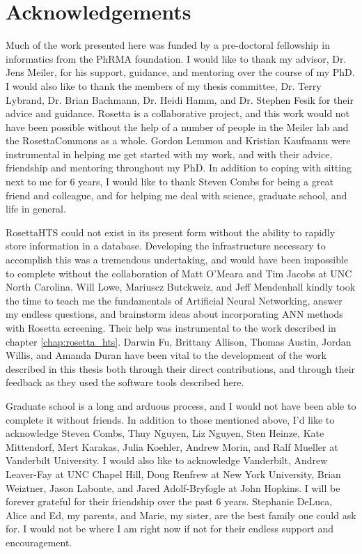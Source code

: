 \chapter*{Acknowledgements}
\vspace{7mm}

Much of the work presented here was funded by a pre-doctoral fellowship in informatics from the PhRMA foundation.
I would like to thank my advisor, Dr. Jens Meiler, for his support, guidance, and mentoring over the course of my PhD. 
I would also like to thank the members of my thesis committee, Dr. Terry Lybrand, Dr. Brian Bachmann, Dr. Heidi Hamm, and Dr. Stephen Fesik for their advice and guidance.
Rosetta is a collaborative project, and this work would not have been possible without the help of a number of people in the Meiler lab and the RosettaCommons as a whole.
Gordon Lemmon and Kristian Kaufmann were instrumental in helping me get started with my work, and with their advice, friendship and mentoring throughout my PhD.
In addition to coping with sitting next to me for 6 years, I would like to thank Steven Combs for being a great friend and colleague, and for helping me deal with science, graduate school, and life in general.

RosettaHTS could not exist in its present form without the ability to rapidly store information in a database.
Developing the infrastructure necessary to accomplish this was a tremendous undertaking, and would have been impossible to complete without the collaboration of Matt O'Meara and Tim Jacobs at UNC North Carolina.
Will Lowe, Mariuscz Butckweiz, %
and Jeff Mendenhall kindly took the time to teach me the fundamentals of Artificial Neural Networking, answer my endless questions, and brainstorm ideas about incorporating ANN methods with Rosetta screening.
Their help was instrumental to the work described in chapter \ref{chap:rosetta_hts}.
Darwin Fu, Brittany Allison, Thomas Austin, Jordan Willis, and Amanda Duran have been vital to the development of the work described in this thesis both through their direct contributions, and through their feedback as they used the software tools described here.

Graduate school is a long and arduous process, and I would not have been able to complete it without friends.
In addition to those mentioned above, I'd like to acknowledge Steven Combs, Thuy Nguyen, Liz Nguyen, Sten Heinze, Kate Mittendorf, Mert Karakas, Julia Koehler, Andrew Morin, and Ralf Mueller at Vanderbilt University.%
I would also like to acknowledge  Vanderbilt, Andrew Leaver-Fay at UNC Chapel Hill, Doug Renfrew at New York University, Brian Weiztner, Jason Labonte, and Jared Adolf-Bryfogle at John Hopkins. %
I will be forever grateful for their friendship over the past 6 years.
Stephanie DeLuca, %
Alice and Ed, my parents, and Marie, my sister, are the best family one could ask for.  I would not be where I am right now if not for their endless support and encouragement.

